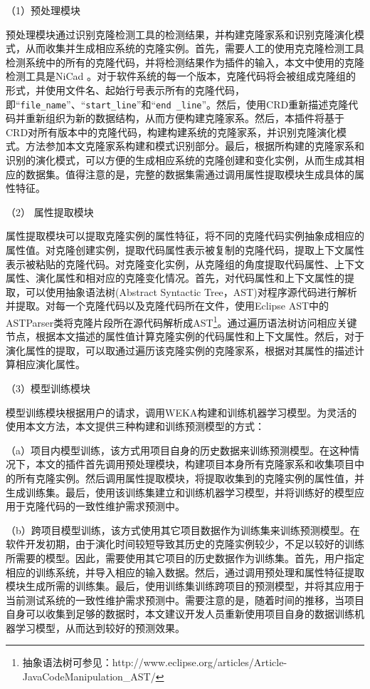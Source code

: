 （1）预处理模块

预处理模块通过识别克隆检测工具的检测结果，并构建克隆家系和识别克隆演化模式，从而收集并生成相应系统的克隆实例。首先，需要人工的使用克克隆检测工具检测系统中的所有的克隆代码，并将检测结果作为插件的输入，本文中使用的克隆检测工具是NiCad 。对于软件系统的每一个版本，克隆代码将会被组成克隆组的形式，并使用文件名、起始行号表示所有的克隆代码，即“{\tt file\_name}”、“{\tt start\_line}”和“{\tt end \_line}”。然后，使用CRD重新描述克隆代码并重新组织为新的数据结构，从而方便构建克隆家系。然后，本插件将基于CRD对所有版本中的克隆代码，构建构建系统的克隆家系，并识别克隆演化模式。方法参加本文克隆家系构建和模式识别部分。最后，根据所构建的克隆家系和识别的演化模式，可以方便的生成相应系统的克隆创建和变化实例，从而生成其相应的数据集。值得注意的是，完整的数据集需通过调用属性提取模块生成具体的属性特征。

（2） 属性提取模块

属性提取模块可以提取克隆实例的属性特征，将不同的克隆代码实例抽象成相应的属性值。对克隆创建实例，提取代码属性表示被复制的克隆代码，提取上下文属性表示被粘贴的克隆代码。对克隆变化实例，从克隆组的角度提取代码属性、上下文属性、演化属性和相对应的克隆变化情况。首先，对代码属性和上下文属性的提取，可以使用抽象语法树(Abstract Syntactic Tree，AST)对程序源代码进行解析并提取。对每一个克隆代码以及克隆代码所在文件，使用Eclipse AST中的 ASTParser类将克隆片段所在源代码解析成AST\footnote{抽象语法树可参见：http://www.eclipse.org/articles/Article-JavaCodeManipulation\_AST/}。通过遍历语法树访问相应关键节点，根据本文描述的属性值计算克隆实例的代码属性和上下文属性。然后，对于演化属性的提取，可以取通过遍历该克隆实例的克隆家系，根据对其属性的描述计算相应演化属性。

（3）模型训练模块

模型训练模块根据用户的请求，调用WEKA构建和训练机器学习模型。为灵活的使用本文方法，本文提供三种构建和训练预测模型的方式：

（a）项目内模型训练，该方式用项目自身的历史数据来训练预测模型。在这种情况下，本文的插件首先调用预处理模块，构建项目本身所有克隆家系和收集项目中的所有克隆实例。然后调用属性提取模块，将提取收集到的克隆实例的属性值，并生成训练集。最后，使用该训练集建立和训练机器学习模型，并将训练好的模型应用于克隆代码的一致性维护需求预测中。

（b）跨项目模型训练，该方式使用其它项目数据作为训练集来训练预测模型。在软件开发初期，由于演化时间较短导致其历史的克隆实例较少，不足以较好的训练所需要的模型。因此，需要使用其它项目的历史数据作为训练集。首先，用户指定相应的训练系统，并导入相应的输入数据。然后，通过调用预处理和属性特征提取模块生成所需的训练集。最后，使用训练集训练跨项目的预测模型，并将其应用于当前测试系统的一致性维护需求预测中。需要注意的是，随着时间的推移，当项目自身可以收集到足够的数据时，本文建议开发人员重新使用项目自身的数据训练机器学习模型，从而达到较好的预测效果。

